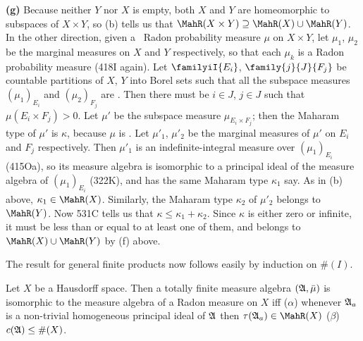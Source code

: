 {{\bf (g)} Because neither $Y$ nor $X$ is empty, both $X$ and $Y$ are
homeomorphic to subspaces of $X\times Y$, so (b) tells us that
$\MahR(X\times Y)\supseteq\MahR(X)\cup\MahR(Y)$.   In the other
direction, given a \Mth\ Radon probability measure $\mu$ on $X\times Y$,
let $\mu_1$, $\mu_2$ be the marginal measures on $X$ and $Y$
respectively, so that each $\mu_k$ is a Radon probability measure
(418I again).
Let $\familyiI{E_i}$, $\family{j}{J}{F_j}$ be countable partitions of
$X$, $Y$ into Borel sets such that all the subspace measures
$(\mu_1)_{E_i}$ and $(\mu_2)_{F_j}$ are \Mth.   Then
there must be $i\in J$, $j\in J$ such that $\mu(E_i\times F_j)>0$.   Let
$\mu'$ be the subspace measure $\mu_{E_i\times F_j}$;  then the Maharam
type of $\mu'$ is $\kappa$, because $\mu$ is \Mth.   Let $\mu'_1$,
$\mu'_2$ be the marginal measures of $\mu'$ on $E_i$ and $F_j$
respectively.   Then $\mu'_1$ is an indefinite-integral measure over
$(\mu_1)_{E_i}$ (415Oa), so its measure algebra is isomorphic to a
principal ideal of the measure algebra of $(\mu_1)_{E_i}$
(322K), and has the same Maharam type $\kappa_1$ say.
As in (b) above, $\kappa_1\in\MahR(X)$.   Similarly, the Maharam type
$\kappa_2$ of $\mu'_2$ belongs to $\MahR(Y)$.   Now 531C tells us that
$\kappa\le\kappa_1+\kappa_2$.   Since $\kappa$ is either zero or
infinite, it must be less than or equal to at least one of them, and
belongs to $\MahR(X)\cup\MahR(Y)$ by (f) above.

The result for general finite products now follows easily by induction
on $\#(I)$.
}%

 Let $X$ be a Hausdorff space.   Then a
totally finite measure algebra $(\frak A,\bar\mu)$ is isomorphic to the
measure algebra of a Radon measure on $X$ iff ($\alpha$) whenever
$\frak A_a$ is a non-trivial homogeneous principal ideal of $\frak A$
then $\tau(\frak A_a)\in\MahR(X)$ ($\beta$) $c(\frak A)\le\#(X)$.

